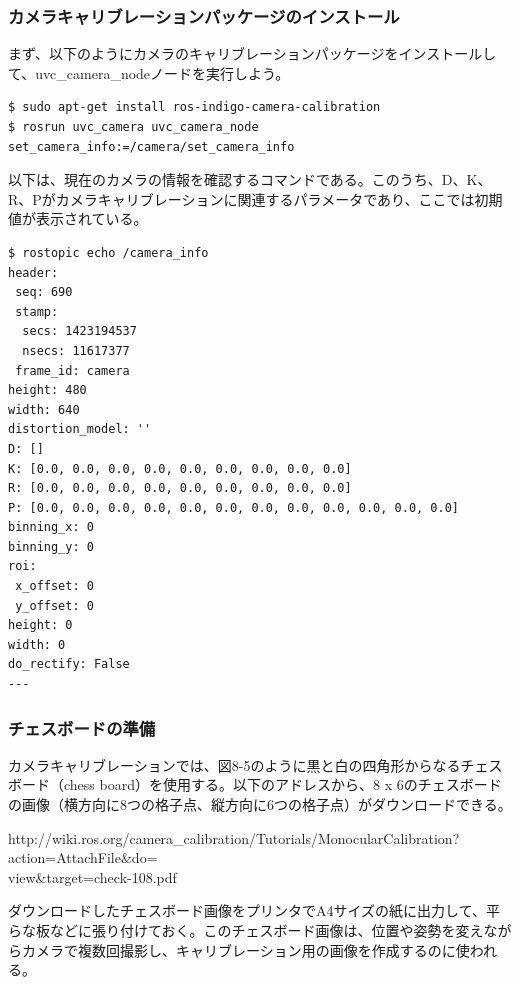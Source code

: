 \subsubsection{カメラキャリブレーションパッケージのインストール}

まず、以下のようにカメラのキャリブレーションパッケージをインストールして、uvc\_camera\_nodeノードを実行しよう。

\begin{lstlisting}[language=ROS]
$ sudo apt-get install ros-indigo-camera-calibration
$ rosrun uvc_camera uvc_camera_node set_camera_info:=/camera/set_camera_info
\end{lstlisting}

以下は、現在のカメラの情報を確認するコマンドである。このうち、D、K、R、Pがカメラキャリブレーションに関連するパラメータであり、ここでは初期値が表示されている。

\begin{lstlisting}[language=ROS]
$ rostopic echo /camera_info
header:
 seq: 690
 stamp:
  secs: 1423194537
  nsecs: 11617377
 frame_id: camera
height: 480
width: 640
distortion_model: ''
D: []
K: [0.0, 0.0, 0.0, 0.0, 0.0, 0.0, 0.0, 0.0, 0.0]
R: [0.0, 0.0, 0.0, 0.0, 0.0, 0.0, 0.0, 0.0, 0.0]
P: [0.0, 0.0, 0.0, 0.0, 0.0, 0.0, 0.0, 0.0, 0.0, 0.0, 0.0, 0.0]
binning_x: 0
binning_y: 0
roi:
 x_offset: 0
 y_offset: 0
height: 0
width: 0
do_rectify: False
---
\end{lstlisting}

\subsubsection{チェスボードの準備}

カメラキャリブレーションでは、図8-5のように黒と白の四角形からなるチェスボード（chess board）を使用する。以下のアドレスから、8 x 6のチェスボードの画像（横方向に8つの格子点、縦方向に6つの格子点）がダウンロードできる。

http://wiki.ros.org/camera\_calibration/Tutorials/MonocularCalibration?action=AttachFile&do=\\view&target=check-108.pdf

ダウンロードしたチェスボード画像をプリンタでA4サイズの紙に出力して、平らな板などに張り付けておく。このチェスボード画像は、位置や姿勢を変えながらカメラで複数回撮影し、キャリブレーション用の画像を作成するのに使われる。

